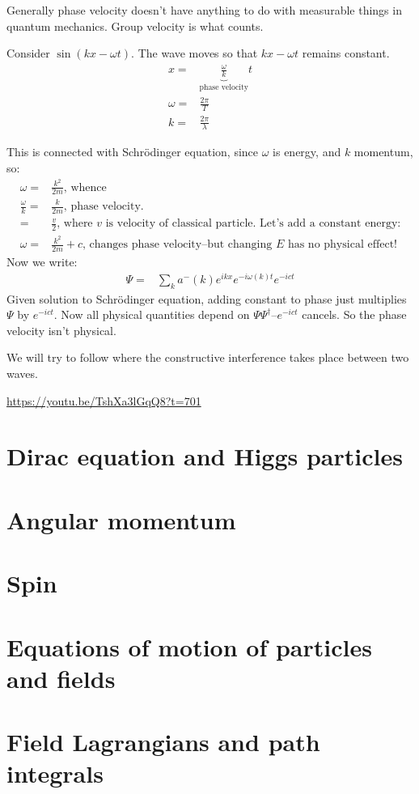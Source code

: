 \documentclass[]{article}
\begin{document}
Generally phase velocity doesn't have anything to do with measurable things in quantum mechanics. Group velocity is what counts.

Consider $\sin(kx-\omega t)$. The wave moves so that $kx-\omega t$ remains constant.
\begin{align*}
x =& \underbrace{\frac{\omega}{k}}_\text{phase velocity} t\\
\omega =& \frac{2 \pi}{T}\\
k =& \frac{2 \pi}{\lambda}
\end{align*}

This is connected with Schr\"odinger equation, since $\omega$ is energy, and $k$ momentum, so:
\begin{align*}
\omega=&\frac{k^2}{2m} \text{, whence}\\
\frac{\omega}{k}=&\frac{k}{2m} \text{, phase velocity.}\\
=& \frac{v}{2}  \text{, where $v$ is velocity of classical particle. Let's add a constant energy:}\\
\omega=&\frac{k^2}{2m}+c \text{, changes phase velocity--but changing $E$ has no physical effect!}
\end{align*}
Now we write:
\begin{align*}
	\Psi =& \sum_k a^-(k) e^{ikx}e^{- i \omega(k) t} e^{-i c t}
\end{align*}
Given solution to Schr\"odinger equation, adding constant to phase just multiplies $\Psi$ by $e^{-i c t}$. Now all physical quantities depend on $\Psi\Psi^\dagger$--$e^{-i c t}$ cancels. So the phase velocity isn't physical.

We will try to follow where the constructive interference takes place between two waves.

\url{https://youtu.be/TshXa3lGqQ8?t=701}
\section{Dirac equation and Higgs particles}

\section{Angular momentum}

\section{Spin}

\section{Equations of motion of particles and fields}

\section{Field Lagrangians and path integrals}
\end{document}
